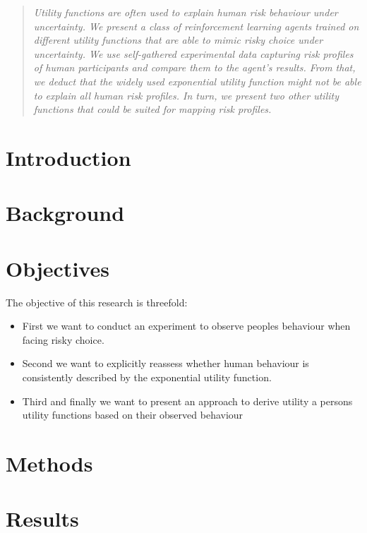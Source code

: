 \documentclass{article}
\begin{document}
\printAffiliationsAndNotice{\icmlEqualContribution} %

\begin{abstract}
\textit{Utility functions are often used to explain human risk behaviour under uncertainty. We present a class of reinforcement learning agents trained on different utility functions that are able to mimic risky choice under uncertainty. We use self-gathered experimental data capturing risk profiles of human participants and compare them to the agent's results. From that, we deduct that the widely used exponential utility function might not be able to explain all human risk profiles. In turn, we present two other utility functions that could be suited for mapping risk profiles.}
\end{abstract}

\section{Introduction}\label{sec:introduction}

\section{Background}\label{sec:background}

\section{Objectives}\label{sec:objectives}
The objective of this research is threefold:
\begin{itemize}
    \item First we want to conduct an experiment to observe peoples behaviour when facing risky choice. 
    \item Second we want to explicitly reassess whether human behaviour is consistently described by the exponential utility function.
    \item Third and finally we want to present an approach to derive utility a persons utility functions based on their observed behaviour
\end{itemize}


\section{Methods}\label{sec:methods}


\section{Results}\label{sec:results}

\end{document}
